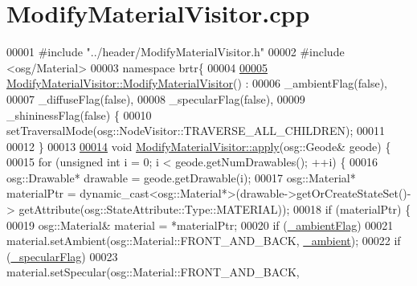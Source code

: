 \hypertarget{_modify_material_visitor_8cpp_source}{\section{Modify\+Material\+Visitor.\+cpp}
\label{_modify_material_visitor_8cpp_source}
}

\begin{DoxyCode}
00001 \textcolor{preprocessor}{#include "../header/ModifyMaterialVisitor.h"}
00002 \textcolor{preprocessor}{#include <osg/Material>}
00003 \textcolor{keyword}{namespace }brtr\{
00004 
\hypertarget{_modify_material_visitor_8cpp_source_l00005}{}\hyperlink{classbrtr_1_1_modify_material_visitor_a240eed8002f7c81d8cd63aaaf4037381}{00005}     \hyperlink{classbrtr_1_1_modify_material_visitor_a240eed8002f7c81d8cd63aaaf4037381}{ModifyMaterialVisitor::ModifyMaterialVisitor}() :
00006         \_ambientFlag(false),
00007         \_diffuseFlag(false), 
00008         \_specularFlag(false), 
00009         \_shininessFlag(false) \{
00010         setTraversalMode(osg::NodeVisitor::TRAVERSE\_ALL\_CHILDREN);
00011 
00012     \}
00013 
\hypertarget{_modify_material_visitor_8cpp_source_l00014}{}\hyperlink{classbrtr_1_1_modify_material_visitor_a74bf42fdfffbc1f7d433c1199f563ccb}{00014}     \textcolor{keywordtype}{void} \hyperlink{classbrtr_1_1_modify_material_visitor_a74bf42fdfffbc1f7d433c1199f563ccb}{ModifyMaterialVisitor::apply}(osg::Geode& geode) \{
00015         \textcolor{keywordflow}{for} (\textcolor{keywordtype}{unsigned} \textcolor{keywordtype}{int} i = 0; i < geode.getNumDrawables(); ++i) \{
00016             osg::Drawable* drawable = geode.getDrawable(i);
00017             osg::Material* materialPtr = \textcolor{keyword}{dynamic\_cast<}osg::Material*\textcolor{keyword}{>}(drawable->getOrCreateStateSet()->
      getAttribute(osg::StateAttribute::Type::MATERIAL));
00018             \textcolor{keywordflow}{if} (materialPtr) \{
00019                 osg::Material& material = *materialPtr;
00020                 \textcolor{keywordflow}{if} (\hyperlink{classbrtr_1_1_modify_material_visitor_a351e4cfeca41aa6f746956661930f994}{\_ambientFlag})
00021                     material.setAmbient(osg::Material::FRONT\_AND\_BACK, \hyperlink{classbrtr_1_1_modify_material_visitor_a1cffff6daf689c23a4e9680cd8f1441b}{\_ambient});
00022                 \textcolor{keywordflow}{if} (\hyperlink{classbrtr_1_1_modify_material_visitor_a154ad99cb3796be6d04347cdbfb66e10}{\_specularFlag})
00023                     material.setSpecular(osg::Material::FRONT\_AND\_BACK, 

\end{DoxyCode}

